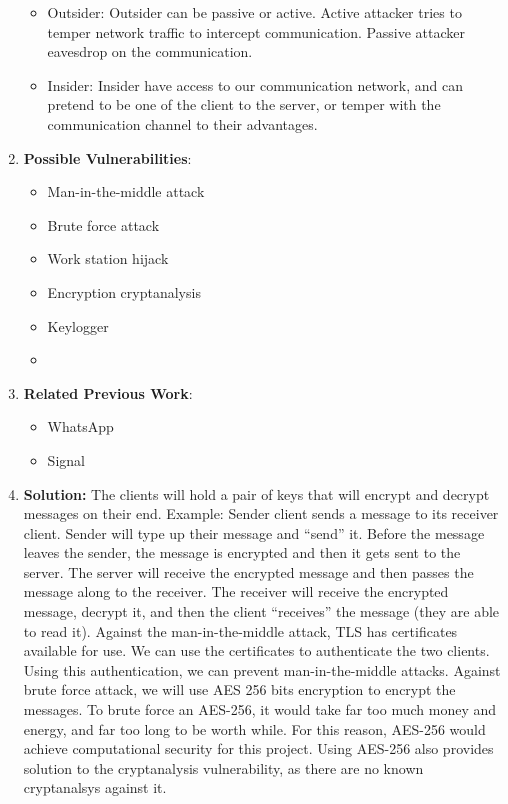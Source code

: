 \documentclass{article}
\begin{document}
\begin{enumerate}
\begin {itemize}
		    \item Outsider: Outsider can be passive or active. Active attacker tries to temper
             network traffic to intercept communication. Passive attacker eavesdrop on the 
             communication.
				
		    \item Insider: Insider have access to our communication network, and can pretend to be
             one of the client to the server, or temper with the communication channel to their 
             advantages.				
        \end {itemize}
    \item \textbf {Possible Vulnerabilities}:
    	\begin {itemize}
        	\item Man-in-the-middle attack
			\item Brute force attack
			\item Work station hijack
			\item Encryption cryptanalysis
			\item Keylogger
			\item 
        \end {itemize}
    \item \textbf {Related Previous Work}:
        \begin {itemize}
            \item WhatsApp
            \item Signal
        \end {itemize}
    \item \textbf {Solution:} The clients will hold a pair of keys that will encrypt and decrypt
     messages on their end. 
    Example: Sender client sends a message to its receiver client. Sender will type up their message
    and “send” it. Before the message leaves the sender, the message is encrypted and then it gets
    sent to the server. The server will receive the encrypted message and then passes the message
    along to the receiver. The receiver will receive the encrypted message, decrypt it, and then the
     client “receives” the message (they are able to read it).\newline
    Against the man-in-the-middle attack, TLS has certificates available for use. We can use the
     certificates to authenticate the two clients. Using this authentication, we can prevent 
     man-in-the-middle attacks.\newline
	Against brute force attack, we will use AES 256 bits encryption to encrypt the messages. To
     brute force an AES-256, it would take far too much money and energy, and far too long to be
      worth while. For this reason, AES-256 would achieve computational security for this project. 
      Using AES-256 also provides solution to the cryptanalysis vulnerability, as there are no known
       cryptanalsys	against it.\newline
	

\end{enumerate}
\end{document}
